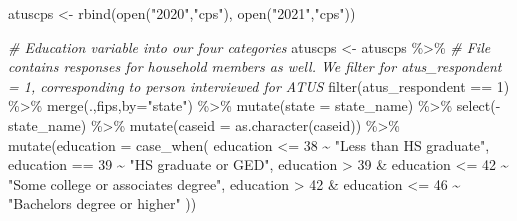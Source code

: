 \documentclass[
]{article}
\newenvironment{Shaded}{\begin{snugshade}}{\end{snugshade}}
\newcommand{\AttributeTok}[1]{\textcolor[rgb]{0.77,0.63,0.00}{#1}}
\newcommand{\CommentTok}[1]{\textcolor[rgb]{0.56,0.35,0.01}{\textit{#1}}}
\newcommand{\DecValTok}[1]{\textcolor[rgb]{0.00,0.00,0.81}{#1}}
\newcommand{\FunctionTok}[1]{\textcolor[rgb]{0.00,0.00,0.00}{#1}}
\newcommand{\NormalTok}[1]{#1}
\newcommand{\OtherTok}[1]{\textcolor[rgb]{0.56,0.35,0.01}{#1}}
\newcommand{\SpecialCharTok}[1]{\textcolor[rgb]{0.00,0.00,0.00}{#1}}
\newcommand{\StringTok}[1]{\textcolor[rgb]{0.31,0.60,0.02}{#1}}
\begin{document}
\begin{Shaded}
\begin{Highlighting}[]
\NormalTok{atuscps }\OtherTok{\textless{}{-}} \FunctionTok{rbind}\NormalTok{(}\FunctionTok{open}\NormalTok{(}\StringTok{"2020"}\NormalTok{,}\StringTok{"cps"}\NormalTok{),}
                 \FunctionTok{open}\NormalTok{(}\StringTok{"2021"}\NormalTok{,}\StringTok{"cps"}\NormalTok{))}
\end{Highlighting}
\end{Shaded}

\begin{Shaded}
\begin{Highlighting}[]
\CommentTok{\# Education variable into our four categories}
\NormalTok{atuscps }\OtherTok{\textless{}{-}}\NormalTok{ atuscps }\SpecialCharTok{\%\textgreater{}\%}
  \CommentTok{\# File contains responses for household members as well. We filter for atus\_respondent = 1, corresponding to person interviewed for ATUS}
  \FunctionTok{filter}\NormalTok{(atus\_respondent }\SpecialCharTok{==} \DecValTok{1}\NormalTok{) }\SpecialCharTok{\%\textgreater{}\%}
  \FunctionTok{merge}\NormalTok{(.,fips,}\AttributeTok{by=}\StringTok{"state"}\NormalTok{) }\SpecialCharTok{\%\textgreater{}\%}
  \FunctionTok{mutate}\NormalTok{(}\AttributeTok{state =}\NormalTok{ state\_name) }\SpecialCharTok{\%\textgreater{}\%}
  \FunctionTok{select}\NormalTok{(}\SpecialCharTok{{-}}\NormalTok{state\_name) }\SpecialCharTok{\%\textgreater{}\%}
  \FunctionTok{mutate}\NormalTok{(}\AttributeTok{caseid =} \FunctionTok{as.character}\NormalTok{(caseid)) }\SpecialCharTok{\%\textgreater{}\%}
  \FunctionTok{mutate}\NormalTok{(}\AttributeTok{education =} \FunctionTok{case\_when}\NormalTok{(}
\NormalTok{    education }\SpecialCharTok{\textless{}=} \DecValTok{38} \SpecialCharTok{\textasciitilde{}} \StringTok{"Less than HS graduate"}\NormalTok{,}
\NormalTok{    education }\SpecialCharTok{==} \DecValTok{39} \SpecialCharTok{\textasciitilde{}} \StringTok{"HS graduate or GED"}\NormalTok{,}
\NormalTok{    education }\SpecialCharTok{\textgreater{}} \DecValTok{39} \SpecialCharTok{\&}\NormalTok{ education }\SpecialCharTok{\textless{}=} \DecValTok{42} \SpecialCharTok{\textasciitilde{}} \StringTok{"Some college or associate\textquotesingle{}s degree"}\NormalTok{,}
\NormalTok{    education }\SpecialCharTok{\textgreater{}} \DecValTok{42} \SpecialCharTok{\&}\NormalTok{ education }\SpecialCharTok{\textless{}=} \DecValTok{46} \SpecialCharTok{\textasciitilde{}} \StringTok{"Bachelor\textquotesingle{}s degree or higher"}
\NormalTok{  ))}
\end{Highlighting}
\end{Shaded}
\end{document}
